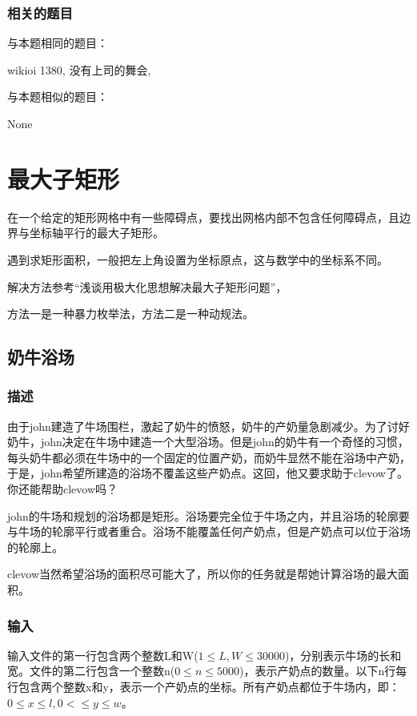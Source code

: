 \subsubsection{相关的题目}
与本题相同的题目：
\begindot
\item wikioi 1380, 没有上司的舞会, 
\myenddot

与本题相似的题目：
\begindot
\item  None
\myenddot


\section{最大子矩形} %
在一个给定的矩形网格中有一些障碍点，要找出网格内部不包含任何障碍点，且边界与坐标轴平行的最大子矩形。

遇到求矩形面积，一般把左上角设置为坐标原点，这与数学中的坐标系不同。

解决方法参考“浅谈用极大化思想解决最大子矩形问题”，

方法一是一种暴力枚举法，方法二是一种动规法。

\subsection{奶牛浴场}
\subsubsection{描述}
由于john建造了牛场围栏，激起了奶牛的愤怒，奶牛的产奶量急剧减少。为了讨好奶牛，john决定在牛场中建造一个大型浴场。但是john的奶牛有一个奇怪的习惯，每头奶牛都必须在牛场中的一个固定的位置产奶，而奶牛显然不能在浴场中产奶，于是，john希望所建造的浴场不覆盖这些产奶点。这回，他又要求助于clevow了。你还能帮助clevow吗？

john的牛场和规划的浴场都是矩形。浴场要完全位于牛场之内，并且浴场的轮廓要与牛场的轮廓平行或者重合。浴场不能覆盖任何产奶点，但是产奶点可以位于浴场的轮廓上。

clevow当然希望浴场的面积尽可能大了，所以你的任务就是帮她计算浴场的最大面积。

\subsubsection{输入}
输入文件的第一行包含两个整数L和W($1 \leq L,W \leq 30000$)，分别表示牛场的长和宽。文件的第二行包含一个整数n($0 \leq n \leq 5000$)，表示产奶点的数量。以下n行每行包含两个整数x和y，表示一个产奶点的坐标。所有产奶点都位于牛场内，即：$0 \leq x \leq l, 0< \leq y \leq w$。

